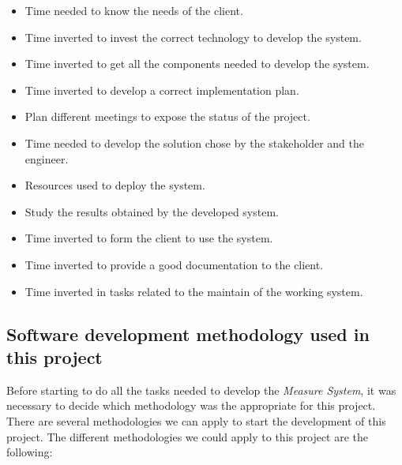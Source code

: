 \begin{itemize}
\item Time needed to know the needs of the client.
\item Time inverted to invest the correct technology to develop the system.
\item Time inverted to get all the components needed to develop the system.
\item Time inverted to develop a correct implementation plan.
\item Plan different meetings to expose the status of the project.
\item Time needed to develop the solution chose by the stakeholder and the engineer.
\item Resources used to deploy the system.
\item Study the results obtained by the developed system.
\item Time inverted to form the client to use the system.
\item Time inverted to provide a good documentation to the client.
\item Time inverted in tasks related to the maintain of the working system.
\end{itemize}

\subsection{Software development methodology used in this project}

Before starting to do all the tasks needed to develop the \textit{Measure System}, it was necessary to decide which methodology was the appropriate for this project. There are several methodologies we can apply to start the development of this project. The different methodologies we could apply to this project are the following:

